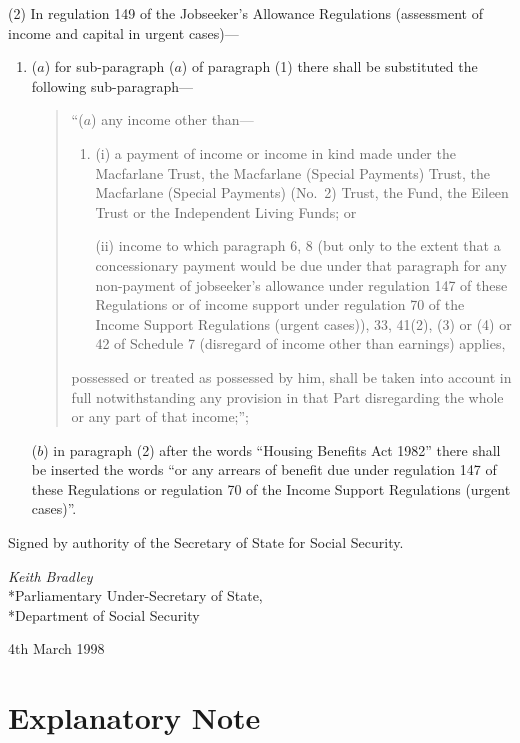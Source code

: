 \documentclass[12pt,a4paper]{article}
\begin{document}
(2) In regulation 149 of the Jobseeker’s Allowance Regulations (assessment of income and capital in urgent cases)—
\begin{enumerate}\item[]
($a$) for sub-paragraph ($a$)  of paragraph (1) there shall be substituted the following sub-paragraph—
\begin{quotation}
“($a$) any income other than—
\begin{enumerate}\item[]
(i) a payment of income or income in kind made under the Macfarlane Trust, the Macfarlane (Special Payments) Trust, the Macfarlane (Special Payments) (No.\ 2) Trust, the Fund, the Eileen Trust or the Independent Living Funds; or

(ii) income to which paragraph 6, 8 (but only to the extent that a concessionary payment would be due under that paragraph for any non-payment of jobseeker’s allowance under regulation 147 of these Regulations or of income support under regulation 70 of the Income Support Regulations (urgent cases)), 33, 41(2), (3) or (4) or 42 of Schedule 7 (disregard of income other than earnings) applies,
\end{enumerate}
possessed or treated as possessed by him, shall be taken into account in full notwithstanding any provision in that Part disregarding the whole or any part of that income;”;
\end{quotation}

($b$) in paragraph (2) after the words “Housing Benefits Act 1982” there shall be inserted the words “or any arrears of benefit due under regulation 147 of these Regulations or regulation 70 of the Income Support Regulations (urgent cases)”.
\end{enumerate}

\bigskip

Signed by authority of the Secretary of State for Social Security.

{\raggedleft
\emph{Keith Bradley}\\*Parliamentary Under-Secretary of
State,\\*Department of Social Security

}

4th March 1998

\small

\part{Explanatory Note}
\end{document}
